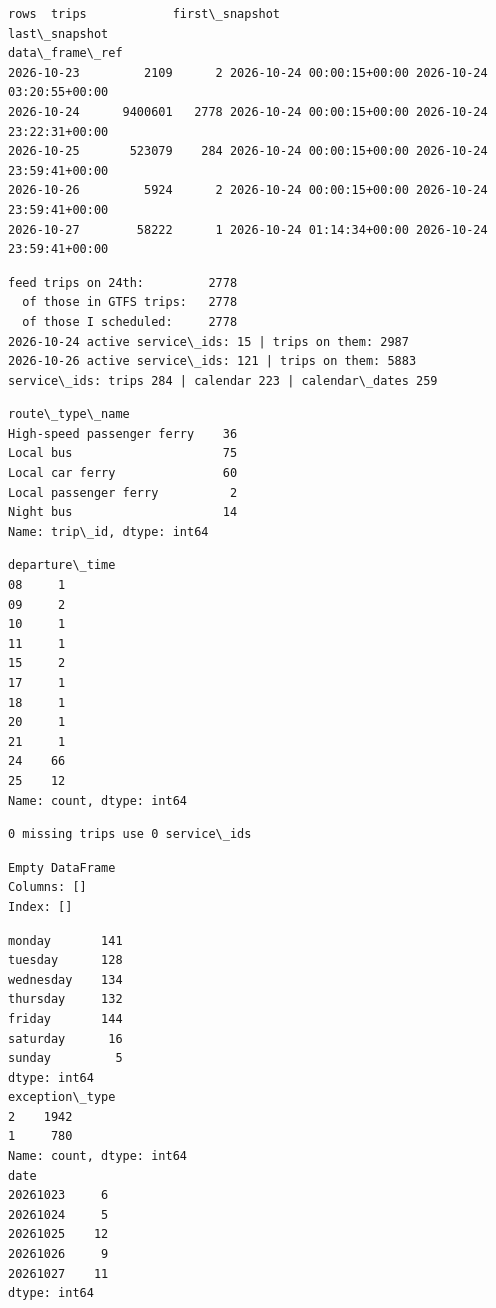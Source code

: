 \documentclass[11pt]{article}
\begin{document}
    
    \begin{Verbatim}[commandchars=\\\{\}]
                   rows  trips            first\_snapshot
last\_snapshot
data\_frame\_ref
2026-10-23         2109      2 2026-10-24 00:00:15+00:00 2026-10-24
03:20:55+00:00
2026-10-24      9400601   2778 2026-10-24 00:00:15+00:00 2026-10-24
23:22:31+00:00
2026-10-25       523079    284 2026-10-24 00:00:15+00:00 2026-10-24
23:59:41+00:00
2026-10-26         5924      2 2026-10-24 00:00:15+00:00 2026-10-24
23:59:41+00:00
2026-10-27        58222      1 2026-10-24 01:14:34+00:00 2026-10-24
23:59:41+00:00
    \end{Verbatim}

    \begin{Verbatim}[commandchars=\\\{\}]
feed trips on 24th:         2778
  of those in GTFS trips:   2778
  of those I scheduled:     2778
2026-10-24 active service\_ids: 15 | trips on them: 2987
2026-10-26 active service\_ids: 121 | trips on them: 5883
service\_ids: trips 284 | calendar 223 | calendar\_dates 259
    \end{Verbatim}

    \begin{Verbatim}[commandchars=\\\{\}]
route\_type\_name
High-speed passenger ferry    36
Local bus                     75
Local car ferry               60
Local passenger ferry          2
Night bus                     14
Name: trip\_id, dtype: int64
    \end{Verbatim}

    \begin{Verbatim}[commandchars=\\\{\}]
departure\_time
08     1
09     2
10     1
11     1
15     2
17     1
18     1
20     1
21     1
24    66
25    12
Name: count, dtype: int64
    \end{Verbatim}

    \begin{Verbatim}[commandchars=\\\{\}]
0 missing trips use 0 service\_ids
    \end{Verbatim}

    
    \begin{Verbatim}[commandchars=\\\{\}]
Empty DataFrame
Columns: []
Index: []
    \end{Verbatim}

    
    \begin{Verbatim}[commandchars=\\\{\}]
monday       141
tuesday      128
wednesday    134
thursday     132
friday       144
saturday      16
sunday         5
dtype: int64
exception\_type
2    1942
1     780
Name: count, dtype: int64
date
20261023     6
20261024     5
20261025    12
20261026     9
20261027    11
dtype: int64
    \end{Verbatim}
\end{document}
